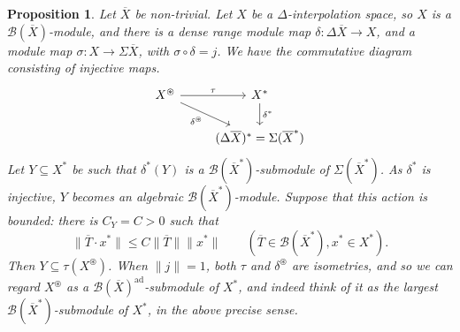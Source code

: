 \documentclass[a4paper,11pt]{article}
\theoremstyle{plain}
\newtheorem{proposition}{Proposition}[section]
\theoremstyle{remark}
\newcommand{\mc}[1]{\mathcal{#1}}
\newcommand{\intdual}{\circledast}
\newcommand{\ad}{{\operatorname{ad}}}
\begin{document}
\begin{proposition}
Let $\overline X$ be non-trivial.
Let $X$ be a $\Delta$-interpolation space, so $X$ is a $\mc B(\overline X)$-module, and there is a dense range module map $\delta \colon \Delta\overline X \to X$, and a module map $\sigma\colon X \to \Sigma\overline X$, with $\sigma\circ\delta = j$.  We have the commutative diagram consisting of injective maps.
\[\begin{tikzcd}
  X^\intdual \arrow[r, "\tau"] \arrow[rd, "\delta^\intdual"'] & X^* \arrow[d, "\delta^*"] \\
  & (\Delta\overline X)^* = \Sigma(\overline X^*)
\end{tikzcd}\]
Let $Y\subseteq X^*$ be such that $\delta^*(Y)$ is a $\mc B(\overline X^*)$-submodule of $\Sigma(\overline X^*)$.  As $\delta^*$ is injective, $Y$ becomes an algebraic $\mc B(\overline X^*)$-module.  Suppose that this action is bounded: there is $C_Y = C>0$ such that
\[ \|\overline T\cdot x^*\| \leq C \|\overline T\| \|x^*\| \qquad (\overline T\in\mc B(\overline X^*), x^*\in X^*). \]
Then $Y\subseteq \tau(X^\intdual)$.  When $\|j\|=1$, both $\tau$ and $\delta^\intdual$ are isometries, and so we can regard $X^\intdual$ as a $\mc B(\overline X)^\ad$-submodule of $X^*$, and indeed think of it as the largest $\mc B(\overline X^*)$-submodule of $X^*$, in the above precise sense.
\end{proposition}
\end{document}
